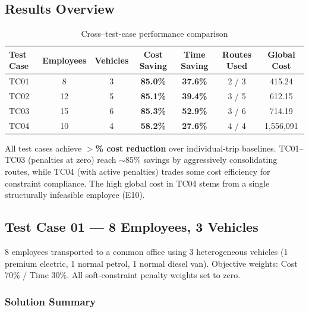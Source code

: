\documentclass[11pt,a4paper]{article}
\newcommand{\saving}[1]{\textcolor{velgreen}{\textbf{#1}}}
\begin{document}
\subsection{Results Overview}

\begin{table}[H]
\centering
\caption{Cross--test-case performance comparison}
\label{tab:overview}
\begin{tabular}{lcccccc}
\toprule
\textbf{Test Case} & \textbf{Employees} & \textbf{Vehicles} & \textbf{Cost Saving} & \textbf{Time Saving} & \textbf{Routes Used} & \textbf{Global Cost} \\
\midrule
\rowcolor{rowalt}
TC01 & 8  & 3 & \saving{85.0\%} & \saving{37.6\%} & 2 / 3 & 415.24 \\
TC02 & 12 & 5 & \saving{85.1\%} & \saving{39.4\%} & 3 / 5 & 612.15 \\
\rowcolor{rowalt}
TC03 & 15 & 6 & \saving{85.3\%} & \saving{52.9\%} & 3 / 6 & 714.19 \\
TC04 & 10 & 4 & \saving{58.2\%} & \saving{27.6\%} & 4 / 4 & 1,556,091 \\
\bottomrule
\end{tabular}
\end{table}

\begin{insightbox}
All test cases achieve \textbf{$>$\% cost reduction} over individual-trip baselines. TC01--TC03 (penalties at zero) reach $\sim$85\% savings by aggressively consolidating routes, while TC04 (with active penalties) trades some cost efficiency for constraint compliance. The high global cost in TC04 stems from a single structurally infeasible employee (E10).
\end{insightbox}

\subsection{Test Case 01 --- 8 Employees, 3 Vehicles}

\begin{instancebox}
8 employees transported to a common office using 3 heterogeneous vehicles (1 premium electric, 1 normal petrol, 1 normal diesel van). Objective weights: Cost 70\% / Time 30\%. All soft-constraint penalty weights set to zero.
\end{instancebox}

\subsubsection{Solution Summary}
\end{document}
